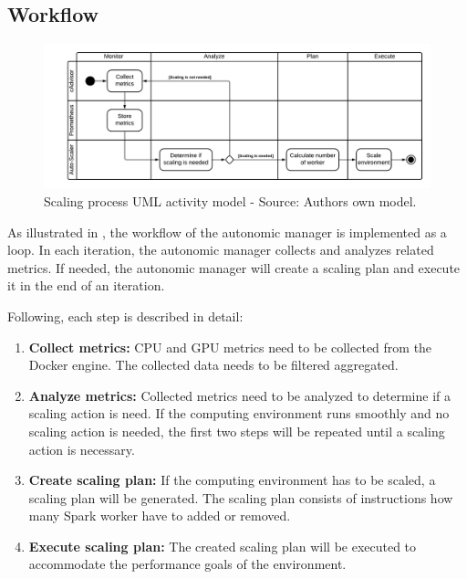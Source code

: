 \subsection{Workflow}
\begin{figure}[h]%
\centering
\includegraphics[scale=0.50]{images/04_conceptual_design/autonomic_manager/autonomic_manager_workflow}%
\caption{Scaling process UML activity model - Source: Authors own model.}%
\label{fig:am-workflow}%
\end{figure}

As illustrated in , the workflow of the autonomic manager is implemented as a loop. In each iteration, the autonomic manager collects and analyzes related metrics. If needed, the autonomic manager will create a scaling plan and execute it in the end of an iteration.


Following, each step is described in detail:

\begin{enumerate}
\item \textbf{Collect metrics:} CPU and GPU metrics need to be collected from the Docker engine. The collected data needs to be filtered aggregated.
\item \textbf{Analyze metrics:} Collected metrics need to be analyzed to determine if a scaling action is need. If the computing environment runs smoothly and no scaling action is needed, the first two steps will be repeated until a scaling action is necessary.
\item \textbf{Create scaling plan:} If the computing environment has to be scaled, a scaling plan will be generated. The scaling plan consists of instructions how many Spark worker have to added or removed.
\item \textbf{Execute scaling plan:} The created scaling plan will be executed to accommodate the performance goals of the environment.
\end{enumerate}


